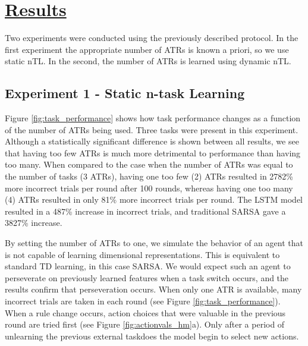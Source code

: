 \documentclass[10pt,letterpaper]{article}
\begin{document}
\section{\underline{Results}}

Two experiments were conducted using the previously described protocol. In the first experiment the appropriate number of ATRs is known a priori, so we use static nTL. In the second, the number of ATRs is learned using dynamic nTL. 

\subsection{Experiment 1 - Static n-task Learning}

Figure \ref{fig:task_performance} shows how task performance changes as a function of the number of ATRs being used. Three tasks were present in this experiment. Although a statistically significant difference is shown between all results, we see that having too few ATRs is much more detrimental to performance than having too many. When compared to the case when the number of ATRs was equal to the number of tasks (3 ATRs), having one too few (2) ATRs resulted in 2782\% more incorrect trials per round after 100 rounds, whereas having one too many (4) ATRs resulted in only 81\% more incorrect trials per round. The LSTM model resulted in a 487\% increase in incorrect trials, and traditional SARSA gave a 3827\% increase.

By setting the number of ATRs to one, we simulate the behavior of an agent that is not capable of learning dimensional representations. This is equivalent to standard TD learning, in this case SARSA. We would expect such an agent to perseverate on previously learned features when a task switch occurs, and the results confirm that perseveration occurs. When only one ATR is available, many incorrect trials are taken in each round (see Figure \ref{fig:task_performance}). When a rule change occurs, action choices that were valuable in the previous round are tried first (see Figure \ref{fig:actionvals_hm}a). Only after a period of unlearning the previous external taskdoes the model begin to select new actions. 

\end{document}
